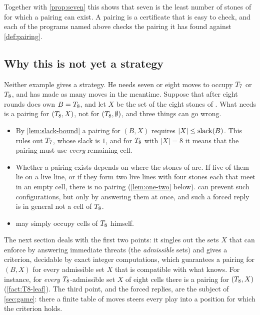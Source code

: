 Together with \cref{prop:seven} this shows that seven is the least number of stones of \Breaker{} for
which a pairing can exist. A pairing is a certificate that is easy to check, and each of the programs
named above checks the pairing it has found against \cref{def:pairing}.

\subsection{Why this is not yet a strategy}\label{ssec:not-yet}

Neither example gives \Breaker{} a strategy. He needs seven or eight moves to occupy $T_7$ or
$T_8$, and \Maker{} has made as many moves in the meantime. Suppose that after eight rounds
\Breaker{} does own $B=T_8$, and let $X$ be the set of the eight stones of \Maker. What \Breaker{}
needs is a pairing for $(T_8,X)$, not for $(T_8,\emptyset)$, and three things can go wrong.
\begin{itemize}
\item By \cref{lem:slack-bound} a pairing for $(B,X)$ requires $|X|\le\operatorname{slack}(B)$. This rules out
      $T_7$, whose slack is $1$, and for $T_8$ with $|X|=8$ it means that the pairing must use
      \emph{every} remaining cell.
\item Whether a pairing exists depends on where the stones of \Maker{} are. If five of them lie on a live
      line, or if they form two live lines with four stones each that meet in an empty cell, there is no
      pairing (\cref{lem:one-two} below). \Breaker{} can prevent such configurations, but only by
      answering them at once, and such a forced reply is in general not a cell of $T_8$.
\item \Maker{} may simply occupy cells of $T_8$ himself.
\end{itemize}
The next section deals with the first two points: it singles out the sets $X$ that \Breaker{} can
enforce by answering immediate threats (the \emph{admissible} sets) and gives a criterion, decidable by
exact integer computations, which guarantees a pairing for $(B,X)$ for every admissible set $X$ that is
compatible with what \Breaker{} knows. For instance, for \emph{every} $T_8$-admissible set $X$ of
eight cells there is a pairing for $(T_8,X)$ (\cref{fact:T8-leaf}). The third point,
and the forced replies, are the subject of \cref{sec:game}: there a finite table of moves steers every
play into a position for which the criterion holds.
